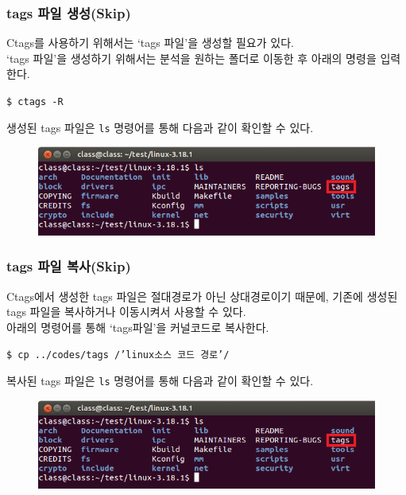 \documentclass[newPxFont,sthlmFooter,nooffset]{beamer}
\begin{document}
\begin{frame}[containsverbatim,t]
  \frametitle{tags 파일 생성(Skip)}
Ctags를 사용하기 위해서는 `tags 파일'을 생성할 필요가 있다.\\
`tags 파일'을 생성하기 위해서는 분석을 원하는 폴더로 이동한 후 아래의 명령을 입력한다.
\begin{mdframed}[backgroundcolor=lightgray,hidealllines=true]
\texttt{\textcolor[rgb]{0,0,0}{\$ ctags -R}}
\end{mdframed}
\bigskip
생성된 tags 파일은 \texttt{ls} 명령어를 통해 다음과 같이 확인할 수 있다.\\
\begin{figure}[h]
\includegraphics[width=0.98\linewidth]{./figure/tags.png}
\end{figure}
\end{frame}

\begin{frame}[containsverbatim,t]
  \frametitle{tags 파일 복사(Skip)}
Ctags에서 생성한 tags 파일은 절대경로가 아닌 상대경로이기 때문에, 기존에 생성된 tags 파일을 복사하거나 이동시켜서 사용할 수 있다.
\\아래의 명령어를 통해 `tags파일'을 커널코드로 복사한다.
\begin{mdframed}[backgroundcolor=lightgray,hidealllines=true]
\texttt{\textcolor[rgb]{0,0,0}{\$ cp ../codes/tags /'linux소스 코드 경로'/}}
\end{mdframed}
\bigskip
복사된 tags 파일은 \texttt{ls} 명령어를 통해 다음과 같이 확인할 수 있다.\\
\begin{figure}[h]
\includegraphics[width=0.98\linewidth]{./figure/tags.png}
\end{figure}
\end{frame}
\end{document}
